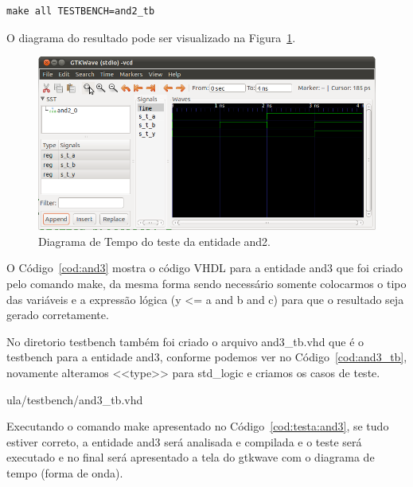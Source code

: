 \documentclass[a4paper,11pt]{report}
\begin{document}
\lstset{numbers=left, numberstyle=\tiny, stepnumber=1, numbersep=3pt}
\begin{lstlisting}[label=cod:testa:and2,caption=Comando para executar o testbench da entidade and2.]
  make all TESTBENCH=and2_tb
\end{lstlisting}

O diagrama do resultado pode ser visualizado na Figura~\ref{fig:gtw:and2}.

\begin{figure}[H]
\centering
\includegraphics[width=1\textwidth]{figuras/gtw_and2.png}
\caption{Diagrama de Tempo do teste da entidade and2.}
\label{fig:gtw:and2}
\end{figure}

O Código~\ref{cod:and3} mostra o código VHDL para a entidade and3 que foi criado pelo comando make, da mesma forma sendo necessário somente colocarmos o tipo das variáveis e a expressão lógica (y <= a and b and c) para que o resultado seja gerado corretamente.

\lstset{language=VHDL}
\lstset{numbers=left, numberstyle=\tiny, stepnumber=1, numbersep=3pt}


No diretorio testbench também foi criado o arquivo and3\_tb.vhd que é o testbench para a entidade and3, conforme podemos ver no Código~\ref{cod:and3_tb}, novamente alteramos <<type>> para std\_logic e criamos os casos de teste.

\lstset{language=VHDL}
\lstset{numbers=left, numberstyle=\tiny, stepnumber=1, numbersep=3pt}
 {ula/testbench/and3_tb.vhd}

Executando o comando make apresentado no Código~\ref{cod:testa:and3}, se tudo estiver correto, a entidade and3 será analisada e compilada e o teste será executado e no final será apresentado a tela do gtkwave com o diagrama de tempo (forma de onda).
\end{document}
